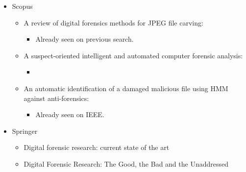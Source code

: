 \begin{itemize}
    \item Scopus
    \begin{itemize}
        \item \cite{Ali20185841} A review of digital forensics methods for JPEG file carving:
        \begin{itemize}
            \item Already seen on previous search.
        \end{itemize}
        \item \cite{AlFahdi201665} A suspect-oriented intelligent and automated computer forensic analysis:
        \begin{itemize}
            \item
        \end{itemize}
        \item \cite{4624000} An automatic identification of a damaged malicious file using HMM against anti-forensics:
        \begin{itemize}
            \item Already seen on IEEE.
        \end{itemize}
    \end{itemize}
\end{itemize}

\begin{itemize}
    \item Springer
    \begin{itemize}
        \item \cite{raghavan2013digital} Digital forensic research: current state of the art
        \item \cite{beebe2009digital} Digital Forensic Research: The Good, the Bad and the Unaddressed
    \end{itemize}
\end{itemize}
